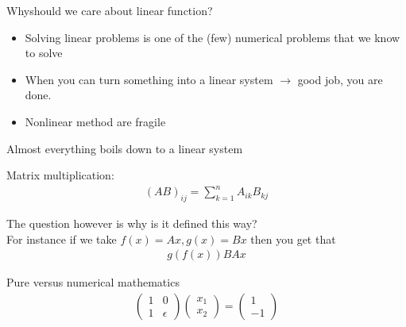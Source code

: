 \begin{parag}{Whyshould we care about linear function?}
    \begin{itemize}
	    \item Solving linear problems is one of the (few) numerical problems that we know to solve 
	    \item When you can turn something into a linear system $\to$ good job, you are done.
	    \item Nonlinear method are fragile
    \end{itemize}
    Almost everything boils down to a linear system
    \begin{definition}
    Matrix multiplication:
    \begin{align*} \left(AB\right)_{ij}=  \sum_{k =  1}^{n}A_{ik}B_{kj} \end{align*}
    \end{definition}
    The question however is why is it defined this way?\\
    For instance if we take $f\left(x\right) =  Ax, g\left(x\right) = Bx$ then you get that
    \begin{align*} g\left(f \left(x\right)\right) BAx \end{align*}
    
\end{parag}



\begin{parag}{Pure versus numerical mathematics}
	\begin{align*} \begin{pmatrix} 1 & 0 \\ 1 & \epsilon \end{pmatrix} \begin{pmatrix} x_1 \\ x_2 \end{pmatrix} = \begin{pmatrix} 1 \\ -1 \end{pmatrix}  \end{align*}
    
\end{parag}

